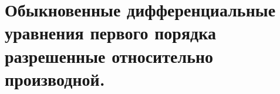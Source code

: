 \documentclass[fleqn, 12pt, a4paper, titlepage]{extarticle}
\begin{document}
	
		
		
		\pagebreak

	
		
		\pagebreak


		
		\parindent=0pt
		\RaggedRight

		
		\section*{Обыкновенные дифференциальные уравнения первого порядка разрешенные относительно производной.}
		

		
\end{document}
